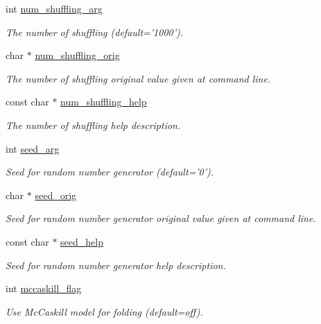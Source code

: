 \begin{DoxyCompactItemize}
int \hyperlink{structgengetopt__args__info_a715feb4a7b63112c0029aca5bc3e0e15}{num\+\_\+shuffling\+\_\+arg}
\begin{DoxyCompactList}\small\item\em The number of shuffling (default='1000'). \end{DoxyCompactList}\item 
char $\ast$ \hyperlink{structgengetopt__args__info_aca977068885436242d4094af483060d7}{num\+\_\+shuffling\+\_\+orig}
\begin{DoxyCompactList}\small\item\em The number of shuffling original value given at command line. \end{DoxyCompactList}\item 
const char $\ast$ \hyperlink{structgengetopt__args__info_a8fa7a97053908512f7fb0078b95a7b8f}{num\+\_\+shuffling\+\_\+help}
\begin{DoxyCompactList}\small\item\em The number of shuffling help description. \end{DoxyCompactList}\item 
int \hyperlink{structgengetopt__args__info_a607715b9c4184c391b4738d5f70512e7}{seed\+\_\+arg}
\begin{DoxyCompactList}\small\item\em Seed for random number generator (default='0'). \end{DoxyCompactList}\item 
char $\ast$ \hyperlink{structgengetopt__args__info_a9b36d9a37ede1d3c6cca9d13a45c3cae}{seed\+\_\+orig}
\begin{DoxyCompactList}\small\item\em Seed for random number generator original value given at command line. \end{DoxyCompactList}\item 
const char $\ast$ \hyperlink{structgengetopt__args__info_ab4344caee458766e8bb69c200668de97}{seed\+\_\+help}
\begin{DoxyCompactList}\small\item\em Seed for random number generator help description. \end{DoxyCompactList}\item 
int \hyperlink{structgengetopt__args__info_a2c35d30cec02884776c507be1f1c22ed}{mccaskill\+\_\+flag}
\begin{DoxyCompactList}\small\item\em Use Mc\+Caskill model for folding (default=off). \end{DoxyCompactList}\item 

\end{DoxyCompactItemize}

